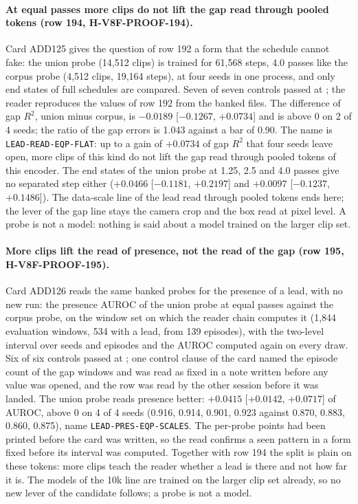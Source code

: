 \paragraph{At equal passes more clips do not lift the gap read through pooled tokens (row 194, H-V8F-PROOF-194).} Card ADD125 gives the question of row 192 a form that the schedule cannot fake: the union probe (14,512 clips) is trained for 61,568 steps, 4.0 passes like the corpus probe (4,512 clips, 19,164 steps), at four seeds in one process, and only end states of full schedules are compared. Seven of seven controls passed at ; the reader reproduces the values of row 192 from the banked files. The difference of gap $R^2$, union minus corpus, is $-0.0189$ [$-0.1267$, $+0.0734$] and is above 0 on 2 of 4 seeds; the ratio of the gap errors is 1.043 against a bar of 0.90. The name is \texttt{LEAD-READ-EQP-FLAT}: up to a gain of $+0.0734$ of gap $R^2$ that four seeds leave open, more clips of this kind do not lift the gap read through pooled tokens of this encoder. The end states of the union probe at 1.25, 2.5 and 4.0 passes give no separated step either ($+0.0466$ [$-0.1181$, $+0.2197$] and $+0.0097$ [$-0.1237$, $+0.1486$]). The data-scale line of the lead read through pooled tokens ends here; the lever of the gap line stays the camera crop and the box read at pixel level. A probe is not a model: nothing is said about a model trained on the larger clip set.

\paragraph{More clips lift the read of presence, not the read of the gap (row 195, H-V8F-PROOF-195).} Card ADD126 reads the same banked probes for the presence of a lead, with no new run: the presence AUROC of the union probe at equal passes against the corpus probe, on the window set on which the reader chain computes it (1,844 evaluation windows, 534 with a lead, from 139 episodes), with the two-level interval over seeds and episodes and the AUROC computed again on every draw. Six of six controls passed at ; one control clause of the card named the episode count of the gap windows and was read as fixed in a note written before any value was opened, and the row was read by the other session before it was landed. The union probe reads presence better: $+0.0415$ [$+0.0142$, $+0.0717$] of AUROC, above 0 on 4 of 4 seeds (0.916, 0.914, 0.901, 0.923 against 0.870, 0.883, 0.860, 0.875), name \texttt{LEAD-PRES-EQP-SCALES}. The per-probe points had been printed before the card was written, so the read confirms a seen pattern in a form fixed before its interval was computed. Together with row 194 the split is plain on these tokens: more clips teach the reader whether a lead is there and not how far it is. The models of the 10k line are trained on the larger clip set already, so no new lever of the candidate follows; a probe is not a model.

